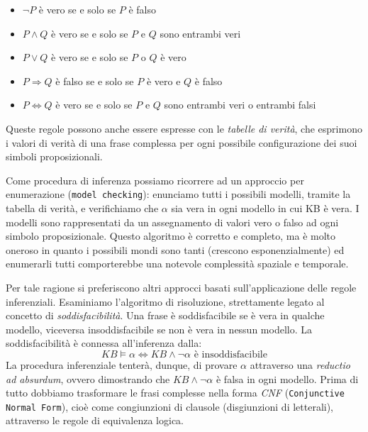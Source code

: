 		\begin{itemize}
			\item $\neg P$ è vero se e solo se $P$ è falso
			\item $P\wedge Q$ è vero se e solo se $P$ e $Q$ sono entrambi veri
			\item $P\vee Q$ è vero se e solo se $P$ o $Q$ è vero
			\item $P\Rightarrow Q$ è falso se e solo se $P$ è vero e $Q$ è falso
			\item $P\Leftrightarrow Q$ è vero se e solo se $P$ e $Q$ sono entrambi veri o entrambi falsi
		\end{itemize}
		Queste regole possono anche essere espresse con le \emph{tabelle di verità}, che esprimono i valori di verità di una frase complessa per ogni possibile configurazione dei suoi simboli proposizionali.\par
		Come procedura di inferenza possiamo ricorrere ad un approccio per enumerazione (\texttt{model checking}): enunciamo tutti i possibili modelli, tramite la tabella di verità, e verifichiamo che $\alpha$ sia vera in ogni modello in cui KB è vera. I modelli sono rappresentati da un assegnamento di valori vero o falso ad ogni simbolo proposizionale. Questo algoritmo è corretto e completo, ma è molto oneroso in quanto i possibili mondi sono tanti (crescono esponenzialmente) ed enumerarli tutti comporterebbe una notevole complessità spaziale e temporale.
		\par
		Per tale ragione si preferiscono altri approcci basati sull'applicazione delle regole inferenziali. Esaminiamo l'algoritmo di risoluzione, strettamente legato al concetto di \emph{soddisfacibilità}. Una frase è soddisfacibile se è vera in qualche modello, viceversa insoddisfacibile se non è vera in nessun modello. La soddisfacibilità è connessa all'inferenza dalla:
		\begin{equation}
		KB\vDash\alpha \iff KB\wedge \neg \alpha \mbox{ è insoddisfacibile}
		\end{equation}
		La procedura inferenziale tenterà, dunque, di provare $\alpha$ attraverso una \emph{reductio ad absurdum}, ovvero dimostrando che $KB\wedge \neg \alpha$ è falsa in ogni modello. 
		Prima di tutto dobbiamo trasformare le frasi complesse nella forma \emph{CNF} (\texttt{Conjunctive Normal Form}), cioè come congiunzioni di clausole (disgiunzioni di letterali), attraverso le regole di equivalenza logica. %

